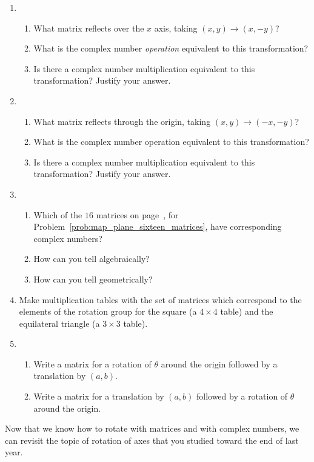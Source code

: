 \documentclass[../textbook.tex]{subfiles}
\begin{document}
\begin{enumerate}
\setcounter{enumi}{\value{problem_i}}
\item\begin{enumerate}
\item What matrix reflects over the $x$ axis, taking $(x,y)\to (x,-y)$?
\item What is the complex number \textit{operation} equivalent to this transformation?
\item Is there a complex number multiplication equivalent to this transformation? Justify your answer.
\end{enumerate}
\item\begin{enumerate}
\item What matrix reflects through the origin, taking $(x,y)\to (-x,-y)$?
\item What is the complex number operation equivalent to this transformation?
\item Is there a complex number multiplication equivalent to this transformation? Justify your answer.
\end{enumerate}
\item \begin{enumerate}
\item Which of the $16$ matrices on page~\pageref{prob:map_plane_sixteen_matrices}, for Problem~\ref{prob:map_plane_sixteen_matrices}, have corresponding complex numbers?
\item How can you tell algebraically?
\item How can you tell geometrically?
\end{enumerate}
\item Make multiplication tables with the set of matrices which correspond to the elements of the rotation group for the square (a $4\times 4$ table) and the equilateral triangle (a $3\times 3$ table).
\item \begin{enumerate}
\item Write a matrix for a rotation of $\theta$ around the origin followed by a translation by $(a,b)$.
\item Write a matrix for a translation by $(a,b)$ followed by a rotation of $\theta$ around the origin.
\end{enumerate}
\setcounter{problem_i}{\value{enumi}}
\end{enumerate}

\noindent Now that we know how to rotate with matrices and with complex numbers, we can revisit the topic of rotation of axes that you studied toward the end of last year.
\end{document}
